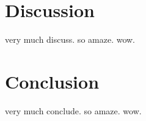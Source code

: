 \documentclass[11pt]{article}
\numberwithin{equation}{section}
\begin{document}
\begin{flushleft}
\section{Discussion}

very much discuss. so amaze. wow.

\section{Conclusion}

very much conclude. so amaze. wow.

\end{flushleft}
\end{document}
